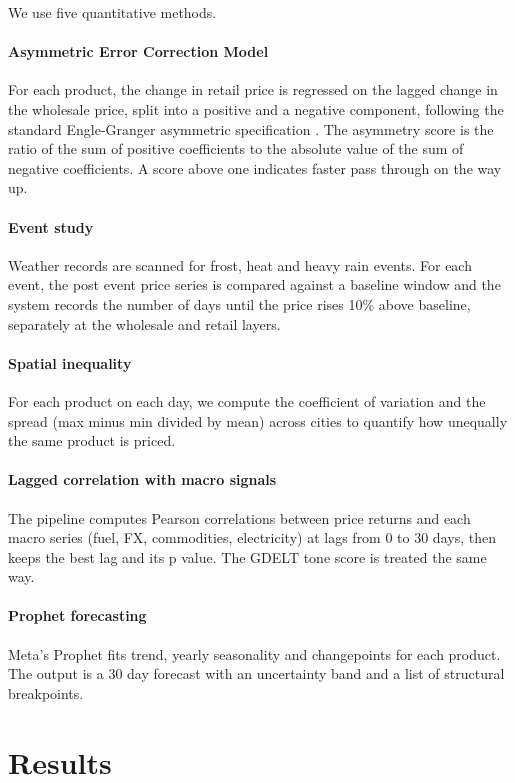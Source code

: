 \documentclass[conference]{IEEEtran}
\begin{document}
We use five quantitative methods.

\paragraph{Asymmetric Error Correction Model} For each product, the change in retail price is regressed on the lagged change in the wholesale price, split into a positive and a negative component, following the standard Engle-Granger asymmetric specification \cite{meyer2004}. The asymmetry score is the ratio of the sum of positive coefficients to the absolute value of the sum of negative coefficients. A score above one indicates faster pass through on the way up.

\paragraph{Event study} Weather records are scanned for frost, heat and heavy rain events. For each event, the post event price series is compared against a baseline window and the system records the number of days until the price rises 10\% above baseline, separately at the wholesale and retail layers.

\paragraph{Spatial inequality} For each product on each day, we compute the coefficient of variation and the spread (max minus min divided by mean) across cities to quantify how unequally the same product is priced.

\paragraph{Lagged correlation with macro signals} The pipeline computes Pearson correlations between price returns and each macro series (fuel, FX, commodities, electricity) at lags from 0 to 30 days, then keeps the best lag and its p value. The GDELT tone score is treated the same way.

\paragraph{Prophet forecasting} Meta's Prophet \cite{prophet} fits trend, yearly seasonality and changepoints for each product. The output is a 30 day forecast with an uncertainty band and a list of structural breakpoints.

\section{Results}
\label{sec:results}
\end{document}
